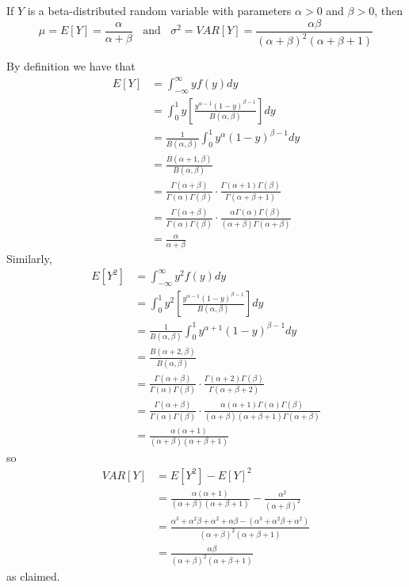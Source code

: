 \documentclass[12pt, a4paper, twoside, openright, titlepage]{book}
\begin{document}
\begin{thm}{}{}
    If $Y$ is a beta-distributed random variable with parameters $\alpha > 0$ and $\beta > 0$, then \begin{equation*}
        \mu = E[Y] = \frac{\alpha}{\alpha + \beta} \;\;\text{ and }\;\;\sigma^2 = VAR[Y] = \frac{\alpha\beta}{(\alpha+\beta)^2(\alpha+\beta+1)}
    \end{equation*}
\end{thm}
\begin{proof*}{}{}
    By definition we have that \begin{align*}
        E[Y] &= \int_{-\infty}^{\infty}yf(y)dy \\
        &= \int_0^1y\left[\frac{y^{\alpha-1}(1-y)^{\beta-1}}{B(\alpha,\beta)}\right]dy \\
        &= \frac{1}{B(\alpha,\beta)}\int_0^1y^{\alpha}(1-y)^{\beta-1}dy \\
        &= \frac{B(\alpha+1,\beta)}{B(\alpha,\beta)} \\
        &= \frac{\Gamma(\alpha+\beta)}{\Gamma(\alpha)\Gamma(\beta)}\cdot\frac{\Gamma(\alpha+1)\Gamma(\beta)}{\Gamma(\alpha+\beta+1)} \\
        &=\frac{\Gamma(\alpha+\beta)}{\Gamma(\alpha)\Gamma(\beta)}\cdot\frac{\alpha\Gamma(\alpha)\Gamma(\beta)}{(\alpha+\beta)\Gamma(\alpha+\beta)} \\ 
        &= \frac{\alpha}{\alpha+\beta}
    \end{align*}
    Similarly, \begin{align*}
        E[Y^2] &= \int_{-\infty}^{\infty}y^2f(y)dy \\
        &= \int_0^1y^2\left[\frac{y^{\alpha-1}(1-y)^{\beta-1}}{B(\alpha,\beta)}\right]dy \\
        &= \frac{1}{B(\alpha,\beta)}\int_0^1y^{\alpha+1}(1-y)^{\beta-1}dy \\
        &= \frac{B(\alpha+2,\beta)}{B(\alpha,\beta)} \\
        &= \frac{\Gamma(\alpha+\beta)}{\Gamma(\alpha)\Gamma(\beta)}\cdot\frac{\Gamma(\alpha+2)\Gamma(\beta)}{\Gamma(\alpha+\beta+2)} \\
        &=\frac{\Gamma(\alpha+\beta)}{\Gamma(\alpha)\Gamma(\beta)}\cdot\frac{\alpha(\alpha+1)\Gamma(\alpha)\Gamma(\beta)}{(\alpha+\beta)(\alpha+\beta+1)\Gamma(\alpha+\beta)} \\ 
        &= \frac{\alpha(\alpha+1)}{(\alpha+\beta)(\alpha+\beta+1)}
    \end{align*}
    so \begin{align*}
        VAR[Y] &= E[Y^2] - E[Y]^2 \\
        &= \frac{\alpha(\alpha+1)}{(\alpha+\beta)(\alpha+\beta+1)} - \frac{\alpha^2}{(\alpha+\beta)^2} \\
        &= \frac{\alpha^3+\alpha^2\beta+\alpha^2+\alpha\beta-(\alpha^3+\alpha^2\beta+\alpha^2)}{(\alpha+\beta)^2(\alpha+\beta+1)} \\
        &= \frac{\alpha\beta}{(\alpha+\beta)^2(\alpha+\beta+1)}
    \end{align*}
    as claimed.
\end{proof*}
\end{document}
